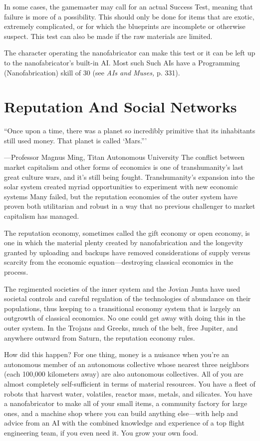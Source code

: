 In some cases, the gamemaster may call for an actual Success Test, 
meaning that failure is more of a possibility. This should only be 
done for items that are exotic, extremely complicated, or for which 
the blueprints are incomplete or otherwise suspect. This test can also 
be made if the raw materials are limited.

The character operating the nanofabricator can make this test or 
it can be left up to the nanofabricator's built-in AI. Most such Such 
AIs have a Programming (Nanofabrication) skill of 30 (see \textit{AIs and }
\textit{Muses,} p. 331).

\section{Reputation And Social Networks}

``Once upon a time, there was a planet so incredibly primitive that its 
inhabitants still used money. That planet is called ‘Mars.'''

—Professor Magnus Ming, Titan Autonomous University
The conflict between market capitalism and other forms of economics
is one of transhumanity's last great culture wars, and it's
still being fought. Transhumanity's expansion into the solar system 
created myriad opportunities to experiment with new economic systems
Many failed, but the reputation economies of the outer system
have proven both utilitarian and robust in a way that no previous 
challenger to market capitalism has managed.

The reputation economy, sometimes called the gift economy or 
open economy, is one in which the material plenty created by nanofabrication
and the longevity granted by uploading and backups
have removed considerations of supply versus scarcity from the 
economic equation—destroying classical economics in the process.

The regimented societies of the inner system and the Jovian 
Junta have used societal controls and careful regulation of the 
technologies of abundance on their populations, thus keeping to a 
transitional economy system that is largely an outgrowth of classical
economics. No one could get away with doing this in the outer
system. In the Trojans and Greeks, much of the belt, free Jupiter, and 
anywhere outward from Saturn, the reputation economy rules.

How did this happen? For one thing, money is a nuisance when 
you're an autonomous member of an autonomous collective whose 
nearest three neighbors (each 100,000 kilometers away) are also 
autonomous collectives. All of you are almost completely self-sufficient
in terms of material resources. You have a fleet of robots
that harvest water, volatiles, reactor mass, metals, and silicates. You 
have a nanofabricator to make all of your small items, a community 
factory for large ones, and a machine shop where you can build 
anything else—with help and advice from an AI with the combined 
knowledge and experience of a top flight engineering team, if you 
even need it. You grow your own food.


